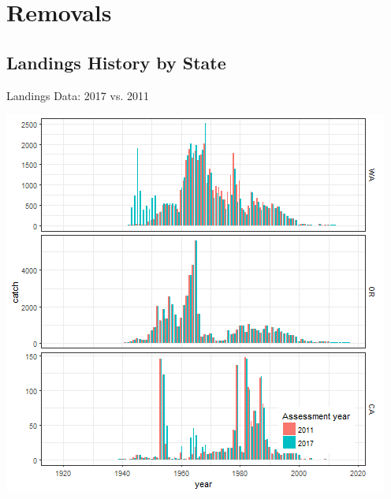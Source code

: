 \documentclass[pdf]{beamer}\usepackage[]{graphicx}\usepackage[]{color}
\begin{document}
\section{Removals}
\subsection{Landings History by State}
\begin{frame}{Landings Data: 2017 vs. 2011}
  \begin{center}
    \includegraphics[scale = 0.45]{figures/pop2017_2011vs2017catches_states.png}
  \end{center}
\end{frame}
\end{document}
